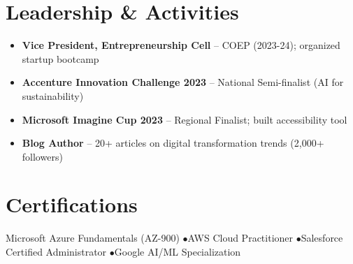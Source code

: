 \documentclass[10pt,a4paper]{article}
\begin{document}
\section{Leadership \& Activities}
\begin{itemize}
    \item \textbf{Vice President, Entrepreneurship Cell} -- COEP (2023-24); organized startup bootcamp
    \item \textbf{Accenture Innovation Challenge 2023} -- National Semi-finalist (AI for sustainability)
    \item \textbf{Microsoft Imagine Cup 2023} -- Regional Finalist; built accessibility tool
    \item \textbf{Blog Author} -- 20+ articles on digital transformation trends (2,000+ followers)
\end{itemize}

\section{Certifications}
Microsoft Azure Fundamentals (AZ-900) \quad$\bullet$\quad AWS Cloud Practitioner \quad$\bullet$\quad Salesforce Certified Administrator \quad$\bullet$\quad Google AI/ML Specialization
\end{document}
